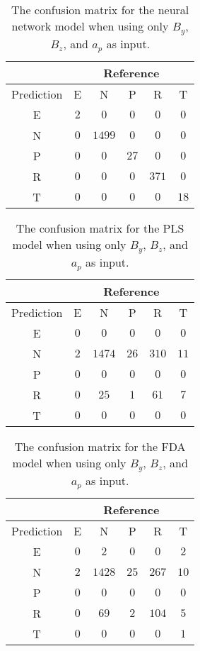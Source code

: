 \begin{table}[!ht]
	\centering
	\begin{tabular}{|c|c|c|c|c|c|}
		\hline
		 & \multicolumn{5}{|c|}{Reference} \\ \hline
		 Prediction & E & N & P & R & T \\ \hline
		 E & $2$ & $0$ & $0$ & $0$ & $0$ \\ \hline
		 N & $0$ & $1499$ & $0$ & $0$ & $0$ \\ \hline
		 P & $0$ & $0$ & $27$ & $0$ & $0$ \\ \hline
		 R & $0$ & $0$ & $0$ & $371$ & $0$ \\ \hline
		 T & $0$ & $0$ & $0$ & $0$ & $18$ \\ \hline
	\end{tabular}
	\caption{The confusion matrix for the neural network model when using only $B_{y}$, $B_{z}$, and $a_{p}$ as input.}
	\label{tab:cm:yzap:nnet}
\end{table}

\begin{table}[!ht]
	\centering
	\begin{tabular}{|c|c|c|c|c|c|}
		\hline
		 & \multicolumn{5}{|c|}{Reference} \\ \hline
		 Prediction & E & N & P & R & T \\ \hline
		 E & $0$ & $0$ & $0$ & $0$ & $0$ \\ \hline
		 N & $2$ & $1474$ & $26$ & $310$ & $11$ \\ \hline
		 P & $0$ & $0$ & $0$ & $0$ & $0$ \\ \hline
		 R & $0$ & $25$ & $1$ & $61$ & $7$ \\ \hline
		 T & $0$ & $0$ & $0$ & $0$ & $0$ \\ \hline
	\end{tabular}
	\caption{The confusion matrix for the PLS model when using only $B_{y}$, $B_{z}$, and $a_{p}$ as input.}
	\label{tab:cm:yzap:pls}
\end{table}

\begin{table}[!ht]
	\centering
	\begin{tabular}{|c|c|c|c|c|c|}
		\hline
		 & \multicolumn{5}{|c|}{Reference} \\ \hline
		 Prediction & E & N & P & R & T \\ \hline
		 E & $0$ & $2$ & $0$ & $0$ & $2$ \\ \hline
		 N & $2$ & $1428$ & $25$ & $267$ & $10$ \\ \hline
		 P & $0$ & $0$ & $0$ & $0$ & $0$ \\ \hline
		 R & $0$ & $69$ & $2$ & $104$ & $5$ \\ \hline
		 T & $0$ & $0$ & $0$ & $0$ & $1$ \\ \hline
	\end{tabular}
	\caption{The confusion matrix for the FDA model when using only $B_{y}$, $B_{z}$, and $a_{p}$ as input.}
	\label{tab:cm:yzap:fda}
\end{table}


